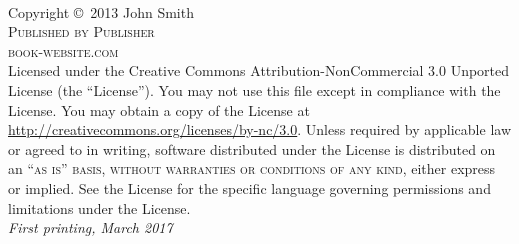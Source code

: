 \documentclass[11pt,fleqn]{book} %
\begin{document}

\begingroup
\thispagestyle{empty}
\vfill
\endgroup


\newpage
~\vfill
\thispagestyle{empty}

\noindent Copyright \copyright\ 2013 John Smith\\ %

\noindent \textsc{Published by Publisher}\\ %

\noindent \textsc{book-website.com}\\ %

\noindent Licensed under the Creative Commons Attribution-NonCommercial 3.0 Unported License (the ``License''). You may not use this file except in compliance with the License. You may obtain a copy of the License at \url{http://creativecommons.org/licenses/by-nc/3.0}. Unless required by applicable law or agreed to in writing, software distributed under the License is distributed on an \textsc{``as is'' basis, without warranties or conditions of any kind}, either express or implied. See the License for the specific language governing permissions and limitations under the License.\\ %

\noindent \textit{First printing, March 2017} %
\end{document}
